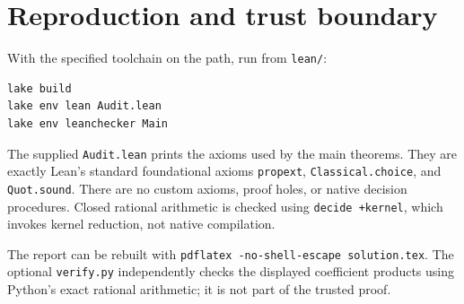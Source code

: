 \documentclass[11pt]{article}
\begin{document}
\section{Reproduction and trust boundary}
With the specified toolchain on the path, run from \texttt{lean/}:
\begin{verbatim}
lake build
lake env lean Audit.lean
lake env leanchecker Main
\end{verbatim}
The supplied \texttt{Audit.lean} prints the axioms used by the main theorems. They are exactly Lean's standard foundational axioms \texttt{propext}, \texttt{Classical.choice}, and \texttt{Quot.sound}. There are no custom axioms, proof holes, or native decision procedures. Closed rational arithmetic is checked using \texttt{decide +kernel}, which invokes kernel reduction, not native compilation.

The report can be rebuilt with \texttt{pdflatex -no-shell-escape solution.tex}. The optional \texttt{verify.py} independently checks the displayed coefficient products using Python's exact rational arithmetic; it is not part of the trusted proof.
\end{document}
